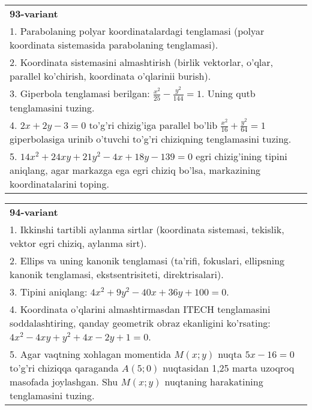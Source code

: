\documentclass{article}
\begin{document}
\begin{tabular}{m{17cm}}
\textbf{93-variant}\\
1. Parabolaning polyar koordinatalardagi tenglamasi (polyar koordinata sistemasida parabolaning tenglamasi).\\

2. Koordinata sistemasini almashtirish (birlik vektorlar, o'qlar, parallel ko'chirish, koordinata o'qlarinii burish).\\

3. Giperbola tenglamasi berilgan: $\frac{x^{2}}{25}-\frac{y^{2}}{144}=1$. Uning qutb tenglamasini tuzing.\\

4. $2x + 2y - 3 = 0$ to'g'ri chizig'iga parallel bo'lib $\frac{x^{2}}{16} + \frac{y^{2}}{64} = 1$ giperbolasiga urinib o'tuvchi to'g'ri chiziqning tenglamasini tuzing.  \\

5. $14x^{2} + 24xy + 21y^{2} - 4x + 18y - 139 = 0$ egri chizig'ining tipini aniqlang, agar markazga ega egri chiziq bo'lsa, markazining koordinatalarini toping.  
\end{tabular}
\vspace{1cm}


\begin{tabular}{m{17cm}}
\textbf{94-variant}\\
1. Ikkinshi tartibli aylanma sirtlar (koordinata sistemasi, tekislik, vektor egri chiziq, aylanma sirt).\\

2. Ellips va uning kanonik tenglamasi (ta'rifi, fokuslari, ellipsning kanonik tenglamasi, ekstsentrisiteti, direktrisalari).\\

3. Tipini aniqlang: $4x^2+9y^2-40x+36y+100=0$.\\

4. Koordinata o'qlarini almashtirmasdan ITECH tenglamasini soddalashtiring, qanday geometrik obraz ekanligini ko'rsating: $4x^{2} - 4xy + y^{2} + 4x - 2y + 1 = 0$.  \\

5. Agar vaqtning xohlagan momentida $M(x;y)$ nuqta $5x - 16 = 0$ to'g'ri chiziqqa qaraganda $A(5;0)$ nuqtasidan 1,25 marta uzoqroq masofada joylashgan. Shu $M(x;y)$ nuqtaning harakatining tenglamasini tuzing.  
\end{tabular}
\vspace{1cm}
\end{document}
